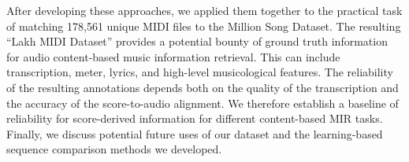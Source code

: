 After developing these approaches, we applied them together to the practical task of matching 178,561 unique MIDI files to the Million Song Dataset.
The resulting ``Lakh MIDI Dataset'' provides a potential bounty of ground truth information for audio content-based music information retrieval.
This can include transcription, meter, lyrics, and high-level musicological features.
The reliability of the resulting annotations depends both on the quality of the transcription and the accuracy of the score-to-audio alignment.
We therefore establish a baseline of reliability for score-derived information for different content-based MIR tasks.
Finally, we discuss potential future uses of our dataset and the learning-based sequence comparison methods we developed.
